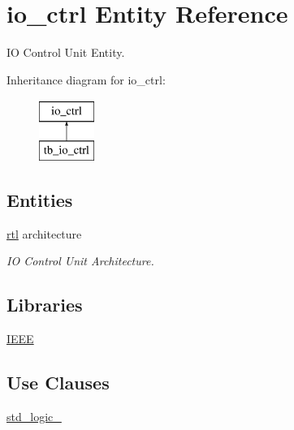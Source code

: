 \hypertarget{classio__ctrl}{}\section{io\+\_\+ctrl Entity Reference}
\label{classio__ctrl}


IO Control Unit Entity.  


Inheritance diagram for io\+\_\+ctrl\+:\begin{figure}[H]
\begin{center}
\leavevmode
\includegraphics[height=2.000000cm]{classio__ctrl}
\end{center}
\end{figure}
\subsection*{Entities}
\begin{DoxyCompactItemize}
\item 
\hyperlink{classio__ctrl_1_1rtl}{rtl} architecture
\begin{DoxyCompactList}\small\item\em IO Control Unit Architecture. \end{DoxyCompactList}\end{DoxyCompactItemize}
\subsection*{Libraries}
 \begin{DoxyCompactItemize}
\item 
\mbox{\label{classio__ctrl_ae4f03c286607f3181e16b9aa12d0c6d4}} 
\hyperlink{classio__ctrl_ae4f03c286607f3181e16b9aa12d0c6d4}{I\+E\+EE} 
\end{DoxyCompactItemize}
\subsection*{Use Clauses}
 \begin{DoxyCompactItemize}
\item 
\mbox{\label{classio__ctrl_acd03516902501cd1c7296a98e22c6fcb}} 
\hyperlink{classio__ctrl_acd03516902501cd1c7296a98e22c6fcb}{std\+\_\+logic\+\_}   
\end{DoxyCompactItemize}
